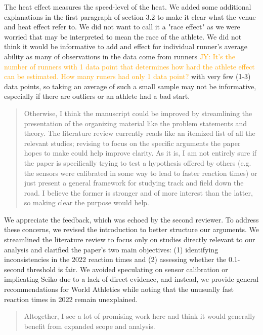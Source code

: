 \documentclass[12pt]{article}
\newcommand{\jy}[1]{\textcolor{orange}{JY: #1}}
\newenvironment{comment}%
{\begin{quotation}\noindent\small\it\color{darkblue}\ignorespaces%
}{\end{quotation}}
\begin{document}
The heat effect measures the speed-level of the heat.  We added some additional
explanations in the first paragraph of section 3.2 to make it clear what the
venue and heat effect refer to. We did not want to call it a "race effect" as we
were worried that may be interpreted to mean the race of the athlete.  We did
not think it would be informative to  add and effect for individual runner's
average ability as many of observations in the data come from runners
\jy{It's the number of runners with 1 data point that determines how
  hard the athlete effect can be estimated. How many runers had only 1
  data point?}
with very few (1-3) data points, so taking an average of such a small sample may
not be informative, especially if there are outliers or an athlete had a bad
start.


\begin{comment}
Otherwise, I think the manuscript could be improved by streamlining the
presentation of the organizing material like the problem statements and theory.
The literature review currently reads like an itemized list of all the relevant
studies; revising to focus on the specific arguments the paper hopes to make
could help improve clarity. As it is, I am not entirely sure if the paper is
specifically trying to test a hypothesis offered by others (e.g. the sensors
were calibrated in some way to lead to faster reaction times) or just present a
general framework for studying track and field down the road. I believe the
former is stronger and of more interest than the latter, so making clear the
purpose would help.
\end{comment}  

We appreciate the feedback, which was echoed by the second
reviewer. To address these concerns, we revised the introduction to
better structure our arguments. We streamlined the literature review
to focus only on studies directly relevant to our analysis and
clarified the paper’s two main objectives: (1) identifying
inconsistencies in the 2022 reaction times and (2) assessing whether
the 0.1-second threshold is fair. We avoided speculating on sensor
calibration or implicating Seiko due to a lack of direct evidence, and
instead, we provide general recommendations for World Athletics while
noting that the unusually fast reaction times in 2022 remain
unexplained.


\begin{comment}
Altogether, I see a lot of promising work here and think it would generally
benefit from expanded scope and analysis.
\end{comment}
\end{document}

